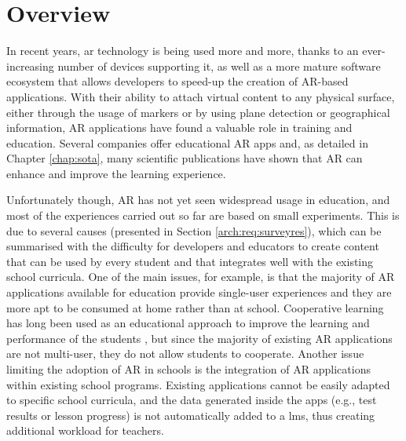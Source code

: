 \section{Overview}\label{sec:introduction}
In recent years, \gls{ar} technology is being used more and more, thanks to an ever-increasing number of devices supporting it, as well as a more mature software ecosystem that allows developers to speed-up the creation of AR-based applications. With their ability to attach virtual content to any physical surface, either through the usage of markers or by using plane detection or geographical information, AR applications have found a valuable role in training and education. Several companies offer educational AR apps and, as detailed in Chapter \ref{chap:sota}, many scientific publications have shown that AR can enhance and improve the learning experience.

Unfortunately though, AR has not yet seen widespread usage in education, and most of the experiences carried out so far are based on small experiments. This is due to several causes (presented in Section \ref{arch:req:surveyres}), which can be summarised with the difficulty for developers and educators to create content that can be used by every student and that integrates well with the existing school curricula. One of the main issues, for example, is that the majority of AR applications available for education provide single-user experiences and they are more apt to be consumed at home rather than at school. Cooperative learning has long been used as an educational approach to improve the learning and performance of the students \citep{Johnson19, kuh2011piecing}, but since the majority of existing AR applications are not multi-user, they do not allow students to cooperate.
Another issue limiting the adoption of AR in schools is the integration of AR applications within existing school programs. Existing applications cannot be easily adapted to specific school curricula, and the data generated inside the apps (e.g., test results or lesson progress) is not automatically added to a \gls{lms}, thus creating additional workload for teachers. 

